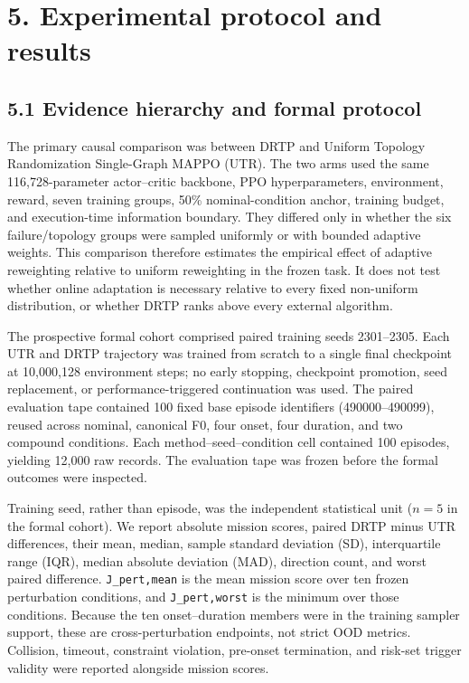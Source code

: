 \section{5. Experimental protocol and results}

\subsection{5.1 Evidence hierarchy and formal protocol}

The primary causal comparison was between DRTP and Uniform Topology Randomization Single-Graph MAPPO (UTR). The two arms used the same 116,728-parameter actor--critic backbone, PPO hyperparameters, environment, reward, seven training groups, 50\% nominal-condition anchor, training budget, and execution-time information boundary. They differed only in whether the six failure/topology groups were sampled uniformly or with bounded adaptive weights. This comparison therefore estimates the empirical effect of adaptive reweighting relative to uniform reweighting in the frozen task. It does not test whether online adaptation is necessary relative to every fixed non-uniform distribution, or whether DRTP ranks above every external algorithm.

The prospective formal cohort comprised paired training seeds 2301--2305. Each UTR and DRTP trajectory was trained from scratch to a single final checkpoint at 10,000,128 environment steps; no early stopping, checkpoint promotion, seed replacement, or performance-triggered continuation was used. The paired evaluation tape contained 100 fixed base episode identifiers (490000--490099), reused across nominal, canonical F0, four onset, four duration, and two compound conditions. Each method--seed--condition cell contained 100 episodes, yielding 12,000 raw records. The evaluation tape was frozen before the formal outcomes were inspected.

Training seed, rather than episode, was the independent statistical unit ($n=5$ in the formal cohort). We report absolute mission scores, paired DRTP minus UTR differences, their mean, median, sample standard deviation (SD), interquartile range (IQR), median absolute deviation (MAD), direction count, and worst paired difference. \texttt{J_pert,mean} is the mean mission score over ten frozen perturbation conditions, and \texttt{J_pert,worst} is the minimum over those conditions. Because the ten onset--duration members were in the training sampler support, these are cross-perturbation endpoints, not strict OOD metrics. Collision, timeout, constraint violation, pre-onset termination, and risk-set trigger validity were reported alongside mission scores.

